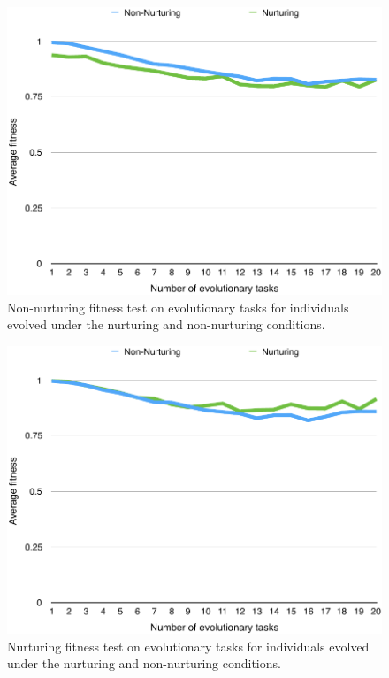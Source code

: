 \documentclass[master]{outhesis}
\begin{document}
\begin{figure}[H]
	\centering
	\includegraphics{NonNurturingFitnessTestPlot.pdf}
	\caption{Non-nurturing fitness test on evolutionary tasks for individuals evolved under the nurturing and non-nurturing conditions.}
\end{figure}

\begin{figure}[H]
	\centering
	\includegraphics{NurturingFitnessTestPlot.pdf}
	\caption{Nurturing fitness test on evolutionary tasks for individuals evolved under the nurturing and non-nurturing conditions.}
\end{figure}

\end{document}
